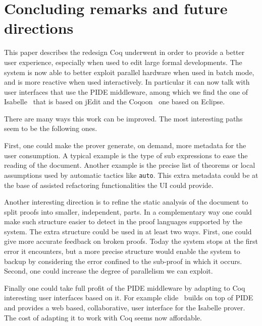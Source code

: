 \documentclass[runningheads,a4paper,oribibl]{llncs}
\newcommand{\tmverbatim}[1]{\lstinline|#1|}
\begin{document}
\section{Concluding remarks and future directions}\label{conclusions}

This paper describes the redesign Coq underwent in order to provide a
better user experience, especially when used to edit large formal
developments.  The system is now able to better exploit parallel
hardware when used in batch mode, and is more reactive when used
interactively. In particular it can now talk with user
interfaces that use the PIDE middleware, among which we find the one
of Isabelle~\cite{Isabelle} that is based on jEdit and the
Coqoon~\cite{coqoon,coqoon2} one based on Eclipse.

There are many ways this work can be improved.
The most interesting paths seem to be the following ones.

First, one could make the prover generate, on demand, more metadata for the
user consumption.  A typical example is the type of sub expressions to
ease the reading of the document.  Another example is the
precise list of theorems or local assumptions used by automatic tactics like
\tmverbatim{auto}. This extra metadata could be at the base of assisted
refactoring functionalities the UI could provide.

Another interesting direction is to refine the static analysis of the
document to split proofs into smaller, independent, parts.  In a
complementary way one could make such structure easier to detect in
the proof languages supported by the system.  The extra structure
could be used in at least two ways.
First, one could give more accurate
feedback on broken proofs. Today the system stops at the first error it
encounters, but a more precise structure would enable the system to
backup by considering the error confined to the sub-proof in which it
occurs.
Second, one could increase the degree of parallelism we can exploit.

Finally one could take full profit of the PIDE middleware by adapting to
Coq interesting user interfaces based on it.  For example
clide~\cite{RingL14} builds on top of PIDE
and provides a web based, collaborative, user interface for the
Isabelle prover.  The cost of adapting it to work with Coq seems
now affordable.





\end{document}
